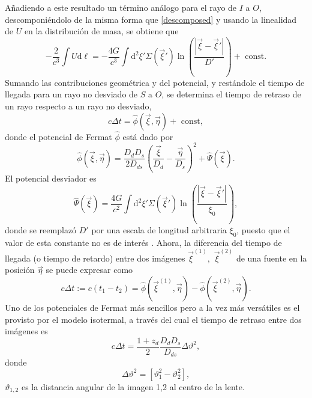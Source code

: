 Añadiendo a este resultado un término análogo para el rayo de $I$ a $O$, descomponiéndolo de la misma forma que \eqref{descomposed} y usando la linealidad de $U$ en la distribución de masa, se obtiene que
\begin{equation}
-\frac{2}{c^3}\int U \mathrm{d}\ell =- \frac{4G}{c^3}\int \mathrm{d}^2\xi' \Sigma(\vec{\xi}')\mathop{ln} \left( \frac{|\vec{\xi}-\vec{\xi}'|}{D'}\right)+ \text{ const}.
\end{equation}
Sumando las contribuciones geométrica y del potencial, y restándole el tiempo de llegada para un rayo no desviado de $S$ a $O$, se determina el tiempo de retraso de un rayo respecto a un rayo no desviado,
\begin{equation}
	c\Delta t = \hat{\phi}(\vec{\xi}, \vec{\eta})+\text{ const},
\end{equation} 
donde el potencial de Fermat $\hat{\phi}$ está dado por
\begin{equation}
	\hat{\phi}(\vec{\xi},\vec{\eta})= \frac{D_dD_s}{2D_{ds}}\left(\frac{\vec{\xi}}{D_d}-\frac{\vec{\eta}}{D_s} \right)^2+\hat{\Psi}(\vec{\xi}).
\end{equation}
El potencial desviador es
\begin{equation}
	\hat{\Psi}(\vec{\xi})=\frac{4G}{c^2}\int \mathrm{d}^2\xi' \Sigma(\vec{\xi}') \mathop{ln}\left( \frac{|\vec{\xi}-\vec{\xi}'|}{\xi_0} \right),
\end{equation}
donde se reemplazó $D'$ por una escala de longitud arbitraria $\xi_0$, puesto que el valor de esta constante no es de interés \cite{schneider_ehlers_falco_1992}. Ahora, la diferencia del tiempo de llegada (o tiempo de retardo) entre dos imágenes $\vec{\xi}^{(1)},$ $\vec{\xi}^{(2)}$ de una fuente en la posición $\vec{\eta}$ se puede expresar como
\begin{equation}
	c\Delta t:=c(t_1-t_2) = \hat{\phi}(\vec{\xi}^{(1)},\vec{\eta})- \hat{\phi}(\vec{\xi}^{(2)},\vec{\eta}).
\end{equation}
Uno de los potenciales de Fermat más sencillos pero a la vez más versátiles es el provisto por el modelo isotermal, a través del cual el tiempo de retraso entre dos imágenes es \cite{Giovi_2001}
\begin{equation}
c\Delta t=\frac{1+z_{d}}{2} \frac{D_{d} D_{s}}{D_{d s}} \Delta \vartheta^{2},
\end{equation}
donde
\begin{equation}
\Delta \vartheta^{2}=\left[\vartheta_{1}^{2}-\vartheta_{2}^{2}\right],
\end{equation}
$\vartheta_{1,2}$ es la distancia angular de la imagen 1,2 al centro de la lente.
